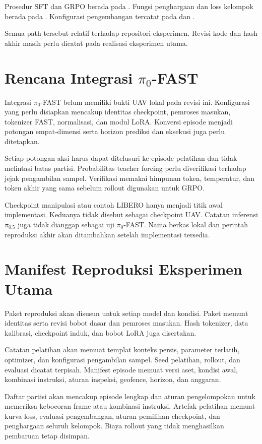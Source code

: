 Prosedur SFT dan GRPO berada pada . Fungsi penghargaan dan loss kelompok berada pada . Konfigurasi pengembangan tercatat pada  dan .

Semua path tersebut relatif terhadap repositori eksperimen. Revisi kode dan hash akhir masih perlu dicatat pada realisasi eksperimen utama.

\section{Rencana Integrasi $\pi_0$-FAST}
Integrasi $\pi_0$-FAST belum memiliki bukti UAV lokal pada revisi ini. Konfigurasi yang perlu disiapkan mencakup identitas checkpoint, pemroses masukan, tokenizer FAST, normalisasi, dan modul LoRA. Konversi episode menjadi potongan empat-dimensi serta horizon prediksi dan eksekusi juga perlu ditetapkan.

Setiap potongan aksi harus dapat ditelusuri ke episode pelatihan dan tidak melintasi batas partisi. Probabilitas teacher forcing perlu diverifikasi terhadap jejak pengambilan sampel. Verifikasi memakai himpunan token, temperatur, dan token akhir yang sama sebelum rollout digunakan untuk GRPO.

Checkpoint manipulasi atau contoh LIBERO hanya menjadi titik awal implementasi. Keduanya tidak disebut sebagai checkpoint UAV. Catatan inferensi $\pi_{0.5}$ juga tidak dianggap sebagai uji $\pi_0$-FAST. Nama berkas lokal dan perintah reproduksi akhir akan ditambahkan setelah implementasi tersedia.

\section{Manifest Reproduksi Eksperimen Utama}
Paket reproduksi akan disusun untuk setiap model dan kondisi. Paket memuat identitas serta revisi bobot dasar dan pemroses masukan. Hash tokenizer, data kalibrasi, checkpoint induk, dan bobot LoRA juga disertakan.

Catatan pelatihan akan memuat templat konteks persis, parameter terlatih, optimizer, dan konfigurasi pengambilan sampel. Seed pelatihan, rollout, dan evaluasi dicatat terpisah. Manifest episode memuat versi aset, kondisi awal, kombinasi instruksi, aturan inspeksi, geofence, horizon, dan anggaran.

Daftar partisi akan mencakup episode lengkap dan aturan pengelompokan untuk memeriksa kebocoran frame atau kombinasi instruksi. Artefak pelatihan memuat kurva loss, evaluasi pengembangan, aturan pemilihan checkpoint, dan penghargaan seluruh kelompok. Biaya rollout yang tidak menghasilkan pembaruan tetap disimpan.

